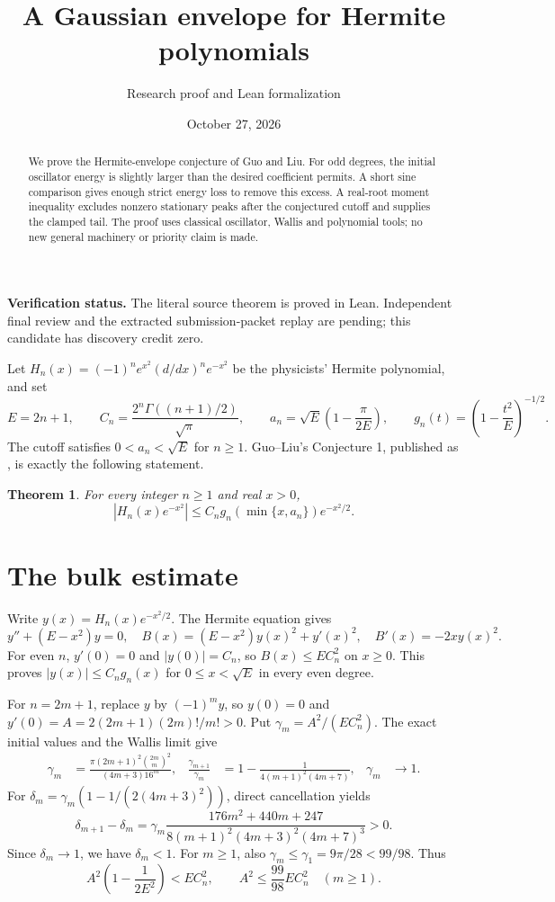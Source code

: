 \documentclass[11pt]{article}
\title{A Gaussian envelope for Hermite polynomials}
\author{Research proof and Lean formalization}
\date{October 27, 2026}
\newtheorem{theorem}{Theorem}
\begin{document}
\maketitle
\begin{abstract}
We prove the Hermite-envelope conjecture of Guo and Liu. For odd degrees, the initial oscillator energy is slightly larger than the desired coefficient permits. A short sine comparison gives enough strict energy loss to remove this excess. A real-root moment inequality excludes nonzero stationary peaks after the conjectured cutoff and supplies the clamped tail. The proof uses classical oscillator, Wallis and polynomial tools; no new general machinery or priority claim is made.
\end{abstract}
\noindent\textbf{Verification status.} The literal source theorem is proved in Lean. Independent final review and the extracted submission-packet replay are pending; this candidate has discovery credit zero.

Let $H_n(x)=(-1)^n e^{x^2}(d/dx)^n e^{-x^2}$ be the physicists' Hermite polynomial, and set
\[
 E=2n+1,\qquad C_n=\frac{2^n\Gamma((n+1)/2)}{\sqrt\pi},\qquad
 a_n=\sqrt E\left(1-\frac\pi{2E}\right),\qquad
 g_n(t)=\left(1-\frac{t^2}{E}\right)^{-1/2}.
\]
The cutoff satisfies $0<a_n<\sqrt E$ for $n\geq1$. Guo--Liu's Conjecture 1, published as \cite[eq.~(29), p.~8]{GL}, is exactly the following statement.
\begin{theorem}\label{main}
For every integer $n\geq1$ and real $x>0$,
\[
 |H_n(x)e^{-x^2}|\leq C_n g_n(\min\{x,a_n\})e^{-x^2/2}.
\]
\end{theorem}

\section*{The bulk estimate}
Write $y(x)=H_n(x)e^{-x^2/2}$. The Hermite equation gives
\begin{equation}\label{energy}
 y''+(E-x^2)y=0,\quad B(x)=(E-x^2)y(x)^2+y'(x)^2,\quad B'(x)=-2xy(x)^2.
\end{equation}
For even $n$, $y'(0)=0$ and $|y(0)|=C_n$, so $B(x)\leq EC_n^2$ on $x\geq0$. This proves $|y(x)|\leq C_ng_n(x)$ for $0\leq x<\sqrt E$ in every even degree.

For $n=2m+1$, replace $y$ by $(-1)^m y$, so $y(0)=0$ and
$y'(0)=A=2(2m+1)(2m)!/m!>0$. Put $\gamma_m=A^2/(EC_n^2)$. The exact initial values and the Wallis limit give
\begin{align}
 \gamma_m&=\frac{\pi(2m+1)^2\binom{2m}{m}^2}{(4m+3)16^m},&
 \frac{\gamma_{m+1}}{\gamma_m}&=1-\frac1{4(m+1)^2(4m+7)},&\gamma_m&\longrightarrow1.\label{wallis}
\end{align}
For $\delta_m=\gamma_m(1-1/(2(4m+3)^2))$, direct cancellation yields
\[
 \delta_{m+1}-\delta_m=
 \gamma_m\frac{176m^2+440m+247}{8(m+1)^2(4m+3)^2(4m+7)^3}>0.
\]
Since $\delta_m\to1$, we have $\delta_m<1$. For $m\geq1$, also
$\gamma_m\leq\gamma_1=9\pi/28<99/98$. Thus
\begin{equation}\label{initial}
 A^2\left(1-\frac1{2E^2}\right)<EC_n^2,\qquad A^2\leq\frac{99}{98}EC_n^2\quad(m\geq1).
\end{equation}
\end{document}
